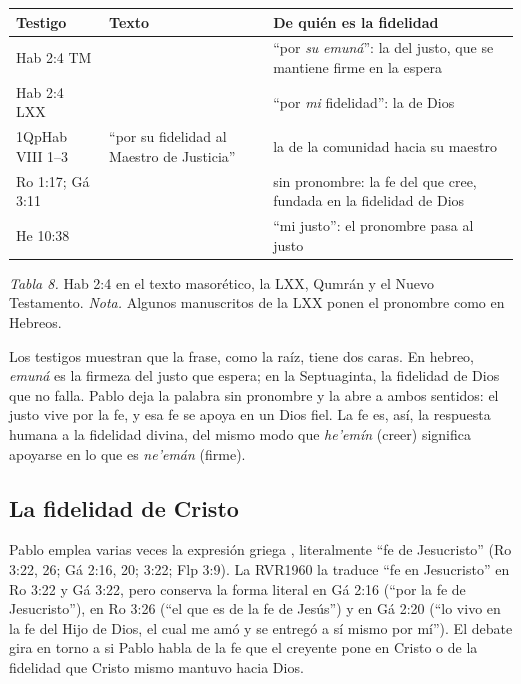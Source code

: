 \begin{center}\small\renewcommand{\arraystretch}{1.25}
\begin{tabular}{@{}L{2.6cm}L{6.2cm}L{5.6cm}@{}}
\toprule
\textbf{Testigo} & \textbf{Texto} & \textbf{De quién es la fidelidad} \\ \midrule
Hab 2:4 TM &  & ``por \emph{su} \emph{emuná}'': la del justo, que se mantiene firme en la espera \\
Hab 2:4 LXX &  & ``por \emph{mi} fidelidad'': la de Dios \\
1QpHab VIII 1--3 & ``por su fidelidad al Maestro de Justicia'' & la de la comunidad hacia su maestro \\
Ro 1:17; Gá 3:11 &  & sin pronombre: la fe del que cree, fundada en la fidelidad de Dios \\
He 10:38 &  & ``mi justo'': el pronombre pasa al justo \\
\bottomrule
\end{tabular}\par
{\footnotesize\color{gris}\textit{Tabla 8.} Hab 2:4 en el texto masorético, la LXX, Qumrán y el Nuevo Testamento. \textit{Nota.} Algunos manuscritos de la LXX ponen el pronombre como en Hebreos.}
\end{center}

Los testigos muestran que la frase, como la raíz, tiene dos caras. En hebreo, \emph{emuná} es la firmeza del justo que espera; en la Septuaginta, la fidelidad de Dios que no falla. Pablo deja la palabra sin pronombre y la abre a ambos sentidos: el justo vive por la fe, y esa fe se apoya en un Dios fiel. La fe es, así, la respuesta humana a la fidelidad divina, del mismo modo que \emph{he'emín} (creer) significa apoyarse en lo que es \emph{ne'emán} (firme).


\subsection{La fidelidad de Cristo}
Pablo emplea varias veces la expresión griega , literalmente ``fe de Jesucristo'' (Ro 3:22, 26; Gá 2:16, 20; 3:22; Flp 3:9). La RVR1960 la traduce ``fe en Jesucristo'' en Ro 3:22 y Gá 3:22, pero conserva la forma literal en Gá 2:16 (``por la fe de Jesucristo''), en Ro 3:26 (``el que es de la fe de Jesús'') y en Gá 2:20 (``lo vivo en la fe del Hijo de Dios, el cual me amó y se entregó a sí mismo por mí''). El debate gira en torno a si Pablo habla de la fe que el creyente pone en Cristo o de la fidelidad que Cristo mismo mantuvo hacia Dios.

